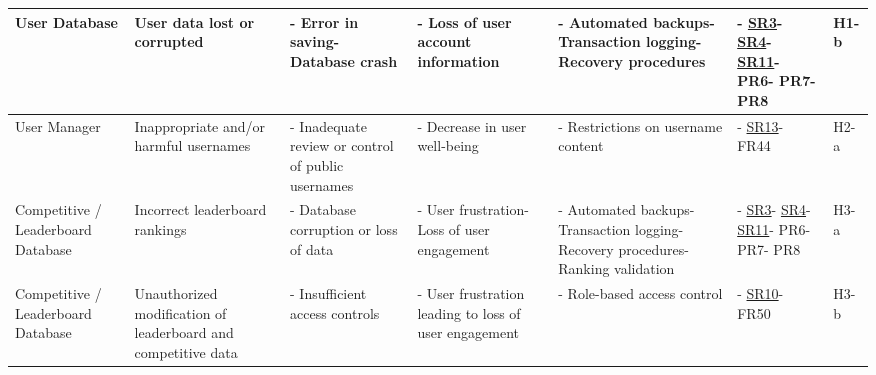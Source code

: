 \documentclass{article}
\begin{document}
\begin{landscape}
\begin{tabularx}{\linewidth}{|P{2.3cm}|Y|Y|Y|Y|P{1.7cm}|P{0.8cm}|}
    User Database &
    User data lost or corrupted &
    - Error in saving\newline- Database crash &
    - Loss of user account information &
    - Automated backups\newline- Transaction logging\newline- Recovery procedures &
    - \hyperref[req:SR3]{SR3}\newline- \hyperref[req:SR4]{SR4}\newline- \hyperref[req:SR11]{SR11}\newline- PR6\newline- PR7\newline- PR8 &
    H1-b \\

    \hline

    User Manager &
    Inappropriate and/or harmful usernames &
    - Inadequate review or control of public usernames &
    - Decrease in user well-being &
    - Restrictions on username content &
    - \hyperref[req:SR13]{SR13}\newline- FR44 &
    H2-a \\

    \hline

    Competitive / Leaderboard Database &
    Incorrect leaderboard rankings &
    - Database corruption or loss of data &
    - User frustration\newline- Loss of user engagement &
    - Automated backups\newline- Transaction logging\newline- Recovery procedures\newline- Ranking validation &
    - \hyperref[req:SR3]{SR3}\newline- \hyperref[req:SR4]{SR4}\newline- \hyperref[req:SR11]{SR11}\newline- PR6\newline- PR7\newline- PR8 &
    H3-a \\

    \hline

    Competitive / Leaderboard Database &
    Unauthorized modification of leaderboard and competitive data &
    - Insufficient access controls &
    - User frustration leading to loss of user engagement &
    - Role-based access control &
    - \hyperref[req:SR10]{SR10}\newline- FR50 &
    H3-b \\


\end{tabularx}
\end{landscape}
\end{document}
